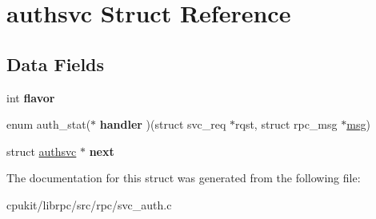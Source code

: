 \hypertarget{structauthsvc}{}\section{authsvc Struct Reference}
\label{structauthsvc}
\subsection*{Data Fields}
\begin{DoxyCompactItemize}
\item 
\mbox{\label{structauthsvc_a21c363f87ecd2a245688b30fcad5edbf}} 
int {\bfseries flavor}
\item 
\mbox{\label{structauthsvc_a0dd546a5cf800289ff4c4f79176a33e3}} 
enum auth\+\_\+stat($\ast$ {\bfseries handler} )(struct svc\+\_\+req $\ast$rqst, struct rpc\+\_\+msg $\ast$\mbox{\hyperlink{structmsg}{msg}})
\item 
\mbox{\label{structauthsvc_a9970dc31ab5b9b311db003857e837d12}} 
struct \mbox{\hyperlink{structauthsvc}{authsvc}} $\ast$ {\bfseries next}
\end{DoxyCompactItemize}


The documentation for this struct was generated from the following file\+:\begin{DoxyCompactItemize}
\item 
cpukit/librpc/src/rpc/svc\+\_\+auth.\+c\end{DoxyCompactItemize}
